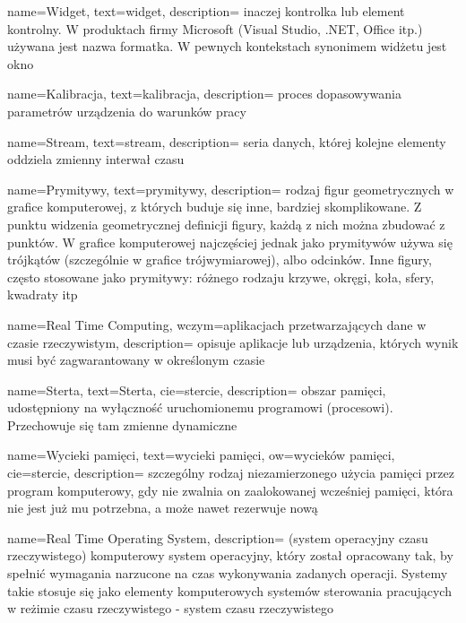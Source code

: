{
    name={Widget},
    text={widget},
    description={
        inaczej kontrolka lub element kontrolny.
    W produktach firmy Microsoft (Visual Studio, .NET, Office itp.)
     używana jest nazwa formatka.
      W pewnych kontekstach synonimem widżetu
      jest okno}
}

{
    name={Kalibracja},
    text={kalibracja},
    description={
        proces dopasowywania parametrów
     urządzenia do warunków pracy}
}


{
    name={Stream},
    text={stream},
    description={
        seria danych, której kolejne elementy
        oddziela zmienny interwał czasu}
}


{
    name={Prymitywy},
    text={prymitywy},
    description={
         rodzaj figur geometrycznych w grafice komputerowej, z
        których buduje się inne, bardziej skomplikowane.
       Z punktu widzenia geometrycznej definicji figury,
       każdą z nich można zbudować z punktów. W grafice
        komputerowej najczęściej jednak jako prymitywów
        używa się trójkątów (szczególnie w grafice trójwymiarowej), albo odcinków.
       Inne figury, często stosowane jako prymitywy:
       różnego rodzaju krzywe, okręgi, koła, sfery, kwadraty itp}
}


{
    name={Real Time Computing},
    wczym={aplikacjach przetwarzających dane w czasie rzeczywistym},
    description={
        opisuje aplikacje lub urządzenia, których wynik musi być
        zagwarantowany w określonym czasie}
}



{
    name={Sterta},
    text={Sterta},
    cie={stercie},
    description={
        obszar pamięci, udostępniony na wyłączność uruchomionemu programowi
         (procesowi). Przechowuje się tam zmienne dynamiczne}
}

{
    name={Wycieki pamięci},
    text={wycieki pamięci},
    ow={wycieków pamięci},
    cie={stercie},
    description={
        szczególny rodzaj niezamierzonego użycia pamięci
        przez program komputerowy, gdy nie zwalnia on zaalokowanej
        wcześniej pamięci, która nie jest już mu potrzebna,
        a może nawet rezerwuje nową}
}


{
    name={Real Time Operating System},
    description={
        (system operacyjny czasu rzeczywistego)
        komputerowy system operacyjny, który został opracowany
         tak, by spełnić wymagania narzucone na czas wykonywania
         zadanych operacji. Systemy takie stosuje się jako elementy
          komputerowych systemów sterowania pracujących w reżimie
          czasu rzeczywistego - system czasu rzeczywistego}
}





